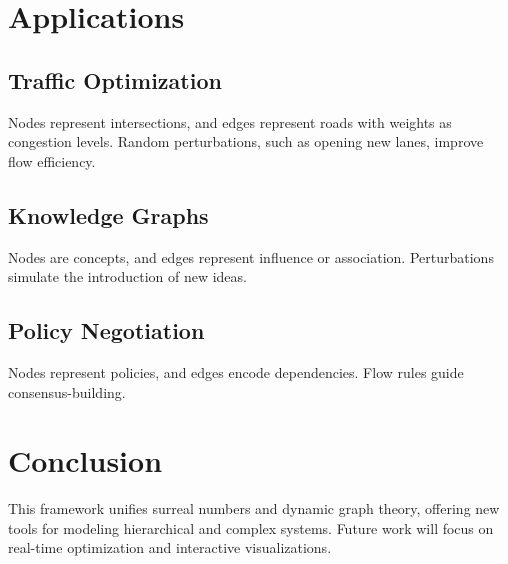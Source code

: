\documentclass[12pt]{article}
\begin{document}
\section{Applications}

\subsection{Traffic Optimization}
Nodes represent intersections, and edges represent roads with weights as congestion levels. Random perturbations, such as opening new lanes, improve flow efficiency.

\subsection{Knowledge Graphs}
Nodes are concepts, and edges represent influence or association. Perturbations simulate the introduction of new ideas.

\subsection{Policy Negotiation}
Nodes represent policies, and edges encode dependencies. Flow rules guide consensus-building.

\section{Conclusion}

This framework unifies surreal numbers and dynamic graph theory, offering new tools for modeling hierarchical and complex systems. Future work will focus on real-time optimization and interactive visualizations.
\end{document}

